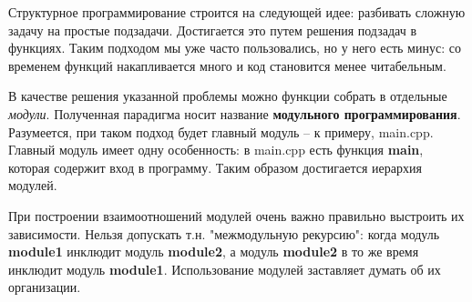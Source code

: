 \begin{lecture}[\lectureSubject]
	\begin{lecSection}
		Структурное программирование строится на следующей идее: разбивать сложную задачу на простые подзадачи. Достигается это путем решения подзадач в функциях. Таким подходом мы уже часто пользовались, но у него есть минус: со временем функций накапливается много и код становится менее читабельным.
		
	\end{lecSection}
	\begin{lecSection}
		В качестве решения указанной проблемы можно функции собрать в отдельные \textit{модули}. Полученная парадигма носит название \textbf{модульного программирования}. Разумеется, при таком подход будет главный модуль -- к примеру, main.cpp. Главный модуль имеет одну особенность: в main.cpp есть функция \textbf{main}, которая содержит вход в программу. Таким образом достигается иерархия модулей.
		
		При построении взаимоотношений модулей очень важно правильно выстроить их зависимости. Нельзя допускать т.н. "межмодульную рекурсию": когда модуль \textbf{module1} инклюдит модуль \textbf{module2}, а модуль \textbf{module2} в то же время инклюдит модуль \textbf{module1}. Использование модулей заставляет думать об их организации.
		

\end{lecSection}
\end{lecture}
